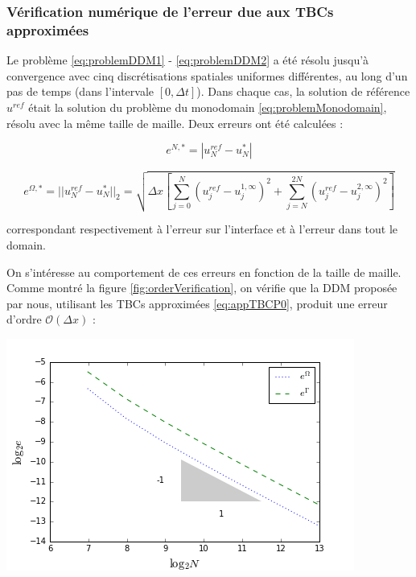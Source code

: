 \subsubsection{Vérification numérique de l'erreur due aux TBCs approximées}

\indent Le problème \eqref{eq:problemDDM1} - \eqref{eq:problemDDM2} a été résolu jusqu'à convergence avec cinq discrétisations spatiales uniformes différentes, au long d'un pas de temps (dans l'intervale $[0,\Delta t]$). Dans chaque cas, la solution de référence $u^{ref}$ était la solution du problème du monodomain \eqref{eq:problemMonodomain}, résolu avec la même taille de maille. Deux erreurs ont été calculées :

\begin{equation*}
	e^{N,*} = |u^{ref}_N - u^{*}_N|
\end{equation*}

\begin{equation}
	\label{eq:errorDDM}
	e^{\Omega,*} = ||u^{ref}_N - u^{*}_N||_2 = \sqrt{\Delta x \left[ \sum_{j=0}^N{(u^{ref}_j - u^{1,\infty}_j)^2 } + \sum_{j=N}^{2N}{(u^{ref}_j - u^{2,\infty}_j)^2 } \right] }
\end{equation}

\noindent correspondant respectivement à l'erreur sur l'interface et à l'erreur dans tout le domain.

\indent On s'intéresse au comportement de ces erreurs en fonction de la taille de maille. Comme montré la figure \ref{fig:orderVerification}, on vérifie que la DDM proposée par nous, utilisant les TBCs approximées \eqref{eq:appTBCP0}, produit une erreur d'ordre $\mathcal{O}(\Delta x)$  :

\begingroup
\begin{center}
	\includegraphics[scale=.5]{figures/convergenceVerificationCorrectN.png}
\end{center}
\endgroup

